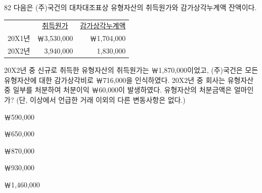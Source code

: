 \begin{question}{82}
다음은 (주)국건의 대차대조표상 유형자산의 취득원가와 감가상각누계액 잔액이다.

{\small\centering
\begin{tabular}{lrr}
\hline
 & \multicolumn{1}{c}{\uline{취득원가}} & \multicolumn{1}{c}{\uline{감가상각누계액}} \\
20X1년 & ￦3,530,000 & ￦1,704,000 \\
20X2년 & 3,940,000 & 1,830,000 \\
\hline
\end{tabular}
\par}

20X2년 중 신규로 취득한 유형자산의 취득원가는 ￦1,870,000이었고, (주)국건은 모든 유형자산에 대한 감가상각비로 ￦716,000을 인식하였다. 20X2년 중 회사는 유형자산 중 일부를 처분하여 처분이익 ￦60,000이 발생하였다. 유형자산의 처분금액은 얼마인가? (단, 이상에서 언급한 거래 이외의 다른 변동사항은 없다.) \par
\begin{choices}
  \item ￦590,000
  \item ￦650,000
  \item ￦870,000
  \item ￦930,000
  \item ￦1,460,000
\end{choices}
\end{question}
